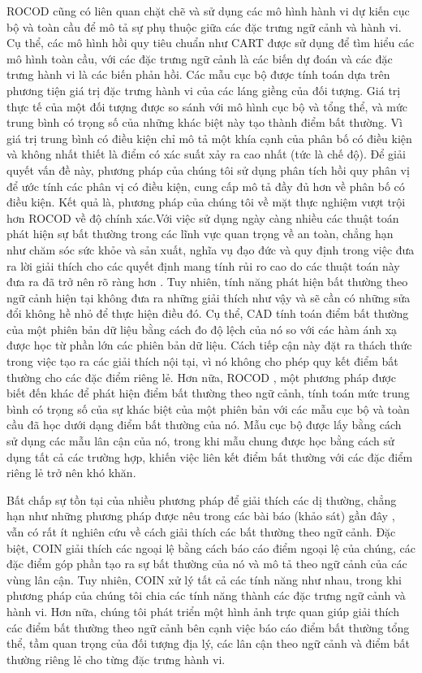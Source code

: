 ROCOD \citep{liang2016robust} cũng có liên quan chặt chẽ và sử dụng các mô hình hành vi dự kiến ​​cục bộ và toàn cầu để mô tả sự phụ thuộc giữa các đặc trưng ngữ cảnh và hành vi. Cụ thể, các mô hình hồi quy tiêu chuẩn như CART được sử dụng để tìm hiểu các mô hình toàn cầu, với các đặc trưng ngữ cảnh là các biến dự đoán và các đặc trưng hành vi là các biến phản hồi. Các mẫu cục bộ được tính toán dựa trên phương tiện giá trị đặc trưng hành vi của các láng giềng của đối tượng. Giá trị thực tế của một đối tượng được so sánh với mô hình cục bộ và tổng thể, và mức trung bình có trọng số của những khác biệt này tạo thành điểm bất thường. Vì giá trị trung bình có điều kiện chỉ mô tả một khía cạnh của phân bố có điều kiện và không nhất thiết là điểm có xác suất xảy ra cao nhất (tức là chế độ). Để giải quyết vấn đề này, phương pháp của chúng tôi sử dụng phân tích hồi quy phân vị để ước tính các phân vị có điều kiện, cung cấp mô tả đầy đủ hơn về phân bố có điều kiện. Kết quả là, phương pháp của chúng tôi về mặt thực nghiệm vượt trội hơn ROCOD về độ chính xác.Với việc sử dụng ngày càng nhiều các thuật toán phát hiện sự bất thường trong các lĩnh vực quan trọng về an toàn, chẳng hạn như chăm sóc sức khỏe và sản xuất, nghĩa vụ đạo đức và quy định trong việc đưa ra lời giải thích cho các quyết định mang tính rủi ro cao do các thuật toán này đưa ra đã trở nên rõ ràng hơn \citep{li2022survey}. Tuy nhiên, tính năng phát hiện bất thường theo ngữ cảnh hiện tại không đưa ra những giải thích như vậy và sẽ cần có những sửa đổi không hề nhỏ để thực hiện điều đó. Cụ thể, CAD \citep{song2007conditional} tính toán điểm bất thường của một phiên bản dữ liệu bằng cách đo độ lệch của nó so với các hàm ánh xạ được học từ phần lớn các phiên bản dữ liệu. Cách tiếp cận này đặt ra thách thức trong việc tạo ra các giải thích nội tại, vì nó không cho phép quy kết điểm bất thường cho các đặc điểm riêng lẻ. Hơn nữa, ROCOD \citep{liang2016robust}, một phương pháp được biết đến khác để phát hiện điểm bất thường theo ngữ cảnh, tính toán mức trung bình có trọng số của sự khác biệt của một phiên bản với các mẫu cục bộ và toàn cầu đã học dưới dạng điểm bất thường của nó. Mẫu cục bộ được lấy bằng cách sử dụng các mẫu lân cận của nó, trong khi mẫu chung được học bằng cách sử dụng tất cả các trường hợp, khiến việc liên kết điểm bất thường với các đặc điểm riêng lẻ trở nên khó khăn.

Bất chấp sự tồn tại của nhiều phương pháp để giải thích các dị thường, chẳng hạn như những phương pháp được nêu trong các bài báo (khảo sát) gần đây \citep{panjei2022survey,li2022survey,xu2021beyond}, vẫn có rất ít nghiên cứu về cách giải thích các bất thường theo ngữ cảnh. Đặc biệt, COIN \citep{liu2018contextual} giải thích các ngoại lệ bằng cách báo cáo điểm ngoại lệ của chúng, các đặc điểm góp phần tạo ra sự bất thường của nó và mô tả theo ngữ cảnh của các vùng lân cận. Tuy nhiên, COIN xử lý tất cả các tính năng như nhau, trong khi phương pháp của chúng tôi chia các tính năng thành các đặc trưng ngữ cảnh và hành vi. Hơn nữa, chúng tôi phát triển một hình ảnh trực quan giúp giải thích các điểm bất thường theo ngữ cảnh bên cạnh việc báo cáo điểm bất thường tổng thể, tầm quan trọng của đối tượng địa lý, các lân cận theo ngữ cảnh và điểm bất thường riêng lẻ cho từng đặc trưng hành vi.




